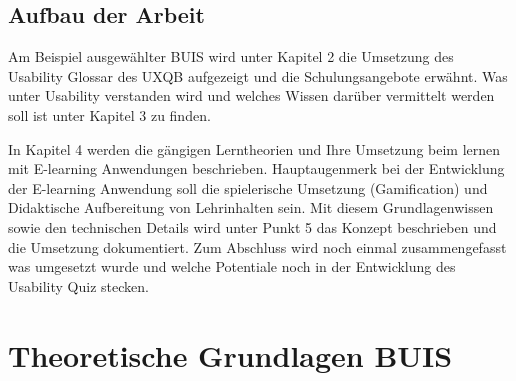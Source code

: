 \documentclass[a4paper, 12pt, twoside, BCOR=20mm, DIV=calc, abstracton, parskip=half*, toc=bibliography, toc=listof, headsepline, footsepline, headings=small, numbers=enddot]{scrreprt}
\begin{document}
	\section{Aufbau der Arbeit}
	Am Beispiel ausgewählter \ac{BUIS} wird unter Kapitel 2 die Umsetzung des Usability Glossar des \ac{UXQB} aufgezeigt und die Schulungsangebote erwähnt. Was unter Usability verstanden wird und welches Wissen darüber vermittelt werden soll ist unter Kapitel 3 zu finden. 
	
	In Kapitel 4 werden die gängigen Lerntheorien und Ihre Umsetzung beim lernen mit E-learning Anwendungen beschrieben. Hauptaugenmerk bei der Entwicklung der E-learning Anwendung soll die spielerische Umsetzung (Gamification) und Didaktische Aufbereitung von Lehrinhalten sein. 
	Mit diesem Grundlagenwissen sowie den technischen Details wird unter Punkt 5 das Konzept beschrieben und die Umsetzung dokumentiert. 
	Zum Abschluss wird noch einmal zusammengefasst was umgesetzt wurde und welche Potentiale noch in der Entwicklung des Usability Quiz stecken. 
	
	\chapter{Theoretische Grundlagen BUIS}
\end{document}
